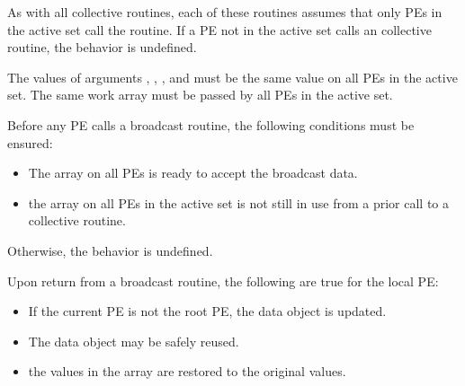 \begin{apidefinition}
{    As with all  \oldtext{\openshmem} collective routines,
    each of these routines assumes that
    only \acp{PE} in the active set call the routine.  If a \ac{PE} not in the
    active set calls an  \oldtext{\openshmem}
    collective routine, the behavior is undefined.
    
    The values of arguments , , ,
    and  must be the same value on all \acp{PE} in the active set.
    The same  work array must be passed by all \acp{PE} in the active set.

    Before any \ac{PE} calls a broadcast routine, the following conditions must be ensured:
    \begin{itemize}
    \item The \dest{} array on all \acp{PE} 
      is ready to accept the broadcast data.
    \item {} the
       array on all \acp{PE} in the
      active set is not still in use from a prior call to a collective
      \openshmem routine.
    \end{itemize}
    Otherwise, the behavior is undefined.

    Upon return from a broadcast routine, the following are true for the local
    \ac{PE}:
    \begin{itemize}
    \item If the current \ac{PE} is not the root \ac{PE},
      the \dest{} data object is updated.
    \item The \source{} data object may be safely reused.
    \item {}
    the values in the  array are restored to the original values.
    \end{itemize}
}




\end{apidefinition}
